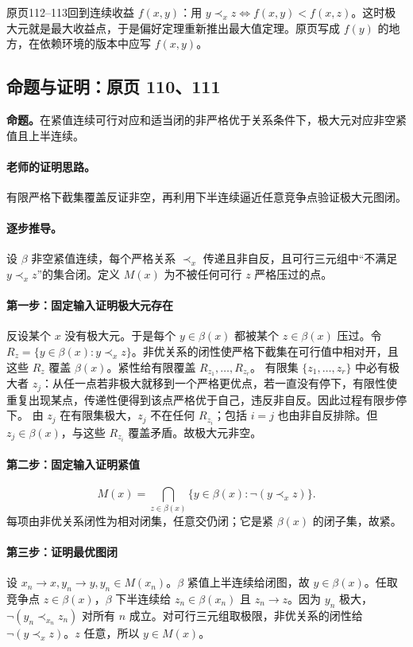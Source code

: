 原页112--113回到连续收益 $f(x,y)$：用 $y\prec_x z\iff f(x,y)<f(x,z)$。这时极大元就是最大收益点，于是偏好定理重新推出最大值定理。原页写成 $f(y)$ 的地方，在依赖环境的版本中应写 $f(x,y)$。


\subsection{命题与证明：原页 110、111}

\textbf{命题。}在紧值连续可行对应和适当闭的非严格优于关系条件下，极大元对应非空紧值且上半连续。

\paragraph{老师的证明思路。}有限严格下截集覆盖反证非空，再利用下半连续逼近任意竞争点验证极大元图闭。

\paragraph{逐步推导。}
设 $\beta$ 非空紧值连续，每个严格关系 $\prec_x$ 传递且非自反，且可行三元组中“不满足 $y\prec_x z$”的集合闭。定义 $M(x)$ 为不被任何可行 $z$ 严格压过的点。
\paragraph{第一步：固定输入证明极大元存在}
反设某个 $x$ 没有极大元。于是每个 $y\in\beta(x)$ 都被某个 $z\in\beta(x)$ 压过。令 $R_z=\{y\in\beta(x):y\prec_x z\}$。非优关系的闭性使严格下截集在可行值中相对开，且这些 $R_z$ 覆盖 $\beta(x)$。紧性给有限覆盖 $R_{z_1},\ldots,R_{z_r}$。
有限集 $\{z_1,\ldots,z_r\}$ 中必有极大者 $z_j$：从任一点若非极大就移到一个严格更优点，若一直没有停下，有限性使重复出现某点，传递性便得到该点严格优于自己，违反非自反。因此过程有限步停下。
由 $z_j$ 在有限集极大，$z_j$ 不在任何 $R_{z_i}$；包括 $i=j$ 也由非自反排除。但 $z_j\in\beta(x)$，与这些 $R_{z_i}$ 覆盖矛盾。故极大元非空。
\paragraph{第二步：固定输入证明紧值}
\[M(x)=\bigcap_{z\in\beta(x)}\{y\in\beta(x):\neg(y\prec_x z)\}.\]
每项由非优关系闭性为相对闭集，任意交仍闭；它是紧 $\beta(x)$ 的闭子集，故紧。
\paragraph{第三步：证明最优图闭}
设 $x_n\to x,y_n\to y,y_n\in M(x_n)$。$\beta$ 紧值上半连续给闭图，故 $y\in\beta(x)$。任取竞争点 $z\in\beta(x)$，$\beta$ 下半连续给 $z_n\in\beta(x_n)$ 且 $z_n\to z$。因为 $y_n$ 极大，$\neg(y_n\prec_{x_n}z_n)$ 对所有 $n$ 成立。对可行三元组取极限，非优关系的闭性给 $\neg(y\prec_x z)$。$z$ 任意，所以 $y\in M(x)$。
